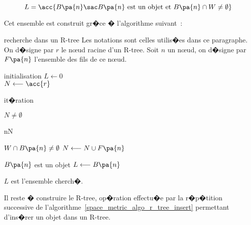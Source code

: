         $$
        L = \acc{ B\pa{n} \sac B\pa{n} \text{ est un objet et } B\pa{n} \cap W \neq \emptyset }
        $$ 


Cet ensemble est construit gr�ce � l'algorithme suivant~:


        \begin{xalgorithm}{recherche dans un R-tree}  \label{space_metric_algo_r_tree_search}
        Les notations sont celles utilis�es dans ce paragraphe. On d�signe par $r$ le n\oe ud racine d'un R-tree. 
        Soit $n$ un n\oe ud, on d�signe par $F\pa{n}$ l'ensemble des fils de ce n\oe ud.
        
        \begin{xalgostep}{initialisation}
        $L \longleftarrow 0$ \\
        $N \longleftarrow \acc{r}$
        \end{xalgostep}
        
        \begin{xalgostep}{it�ration}
        \begin{xwhile}{$N \neq \emptyset$}
            \begin{xforeach}{n}{N}
                \begin{xif}{$W \cap B\pa{n} \neq \emptyset$} 
                  $N \longleftarrow N \cup F\pa{n}$ \\
                    \begin{xif}{$B\pa{n}$ est un objet}
                            $L \longleftarrow B\pa{n}$ 
                    \end{xif}
                \end{xif}
            \end{xforeach}
        \end{xwhile}
        \end{xalgostep}
    
        $L$ est l'ensemble cherch�.
        
        \end{xalgorithm}


Il reste � construire le R-tree, op�ration effectu�e par la r�p�tition successive de l'algorithme~\ref{space_metric_algo_r_tree_insert} permettant d'ins�rer un objet dans un R-tree.

